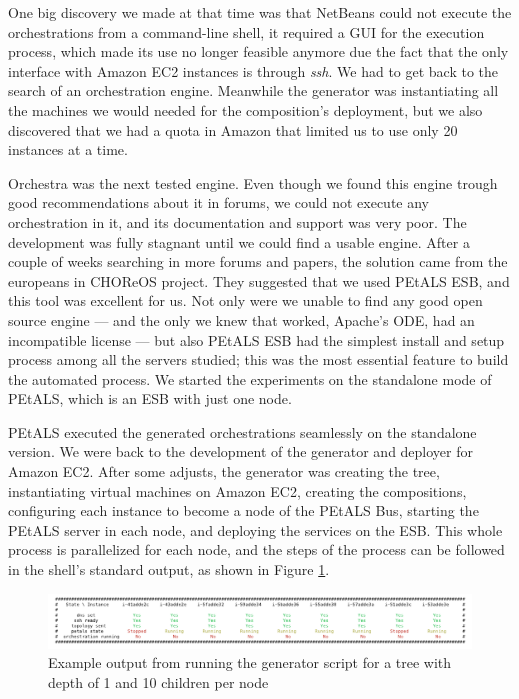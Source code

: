 One big discovery we made at that time was that NetBeans could not execute the orchestrations from a command-line shell, it required a GUI for the execution process, which made its use no longer feasible anymore due the fact that the only interface with Amazon EC2 instances is through \emph{ssh}. We had to get back to the search of an orchestration engine. Meanwhile the generator was instantiating all the machines we would needed for the composition's deployment, but we also discovered that we had a quota in Amazon that limited us to use only 20 instances at a time.

Orchestra was the next tested engine. Even though we found this engine trough good recommendations about it in forums, we could not execute any orchestration in it, and its documentation and support was very poor. The development was fully stagnant until we could find a usable engine. After a couple of weeks searching in more forums and papers, the solution came from the europeans in CHOReOS project. They suggested that we used PEtALS ESB, and this tool was excellent for us. Not only were we unable to find any good open source engine --- and the only we knew that worked, Apache's ODE, had an incompatible license --- but also PEtALS ESB had the simplest install and setup process among all the servers studied; this was the most essential feature to build the automated process. We started the experiments on the standalone mode of PEtALS, which is an ESB with just one node.

PEtALS executed the generated orchestrations seamlessly on the standalone version. We were back to the development of the generator and deployer for Amazon EC2. After some adjusts, the generator was creating the tree, instantiating virtual machines on Amazon EC2, creating the compositions, configuring each instance to become a node of the PEtALS Bus, starting the PEtALS server in each node, and deploying the services on the ESB. This whole process is parallelized for each node, and the steps of the process can be followed in the shell's standard output, as shown in Figure \ref{generation-output}.

\begin{figure}[htb]
	\centering
	\includegraphics[trim= 10mm 0mm 10mm 0mm, clip, width=\textwidth]{images/generation-output}
	\caption{Example output from running the generator script for a tree with depth of 1 and 10 children per node}
	\label{generation-output}
\end{figure}

